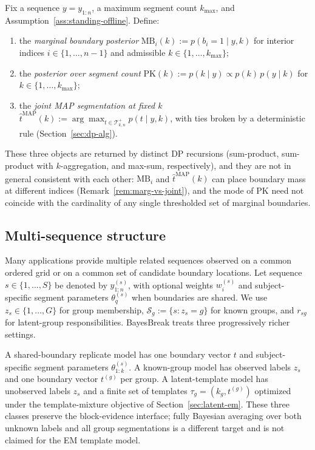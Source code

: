 \begin{definition}
\label{def:posterior-summaries}
Fix a sequence $y=y_{1:n}$, a maximum segment count $k_{\max}$, and Assumption~\ref{ass:standing-offline}.
Define:
\begin{enumerate}[label=(\alph*), leftmargin=2.3em]
    \item the \emph{marginal boundary posterior}
    \(\mathrm{MB}_i(k):=p(b_i=1\mid y,k)\)
    for interior indices $i\in\{1,\dots,n-1\}$ and admissible $k\in\{1,\dots,k_{\max}\}$;
    \item the \emph{posterior over segment count}
    \(\mathrm{PK}(k):=p(k\mid y)\propto p(k)\,p(y\mid k)\)
    for $k\in\{1,\dots,k_{\max}\}$;
    \item the \emph{joint MAP segmentation at fixed $k$}
    \(\widehat t^{\mathrm{MAP}}(k):=\arg\max_{t\in\mathcal{T}^{+}_{k,n}} p(t\mid y,k)\),
    with ties broken by a deterministic rule (Section~\ref{sec:dp-alg}).
\end{enumerate}
These three objects are returned by distinct DP recursions (sum-product, sum-product with
$k$-aggregation, and max-sum, respectively), and they are not in general consistent with each
other: $\mathrm{MB}_i$ and $\widehat t^{\mathrm{MAP}}(k)$ can place boundary mass at different
indices (Remark~\ref{rem:marg-vs-joint}), and the mode of $\mathrm{PK}$ need not coincide with
the cardinality of any single thresholded set of marginal boundaries.
\end{definition}

\subsection{Multi-sequence structure}
\label{sec:problem-multiseq}

Many applications provide multiple related sequences observed on a common ordered grid or on a
common set of candidate boundary locations. Let sequence $s\in\{1,\dots,S\}$ be denoted by
$y^{(s)}_{1:n}$, with optional weights $w_i^{(s)}$ and subject-specific segment parameters
$\theta_q^{(s)}$ when boundaries are shared. We use $z_s\in\{1,\dots,G\}$ for group membership,
$\mathcal{S}_g:=\{s:z_s=g\}$ for known groups, and $r_{sg}$ for latent-group responsibilities.
BayesBreak treats three progressively richer settings.

\begin{definition}
\label{def:multiseq-classes}
A shared-boundary replicate model has one boundary vector $t$ and subject-specific segment
parameters $\theta^{(s)}_{1:k}$. A known-group model has observed labels $z_s$ and one boundary
vector $t^{(g)}$ per group. A latent-template model has unobserved labels $z_s$ and a finite set of
templates $\tau_g=(k_g,t^{(g)})$ optimized under the template-mixture objective of
Section~\ref{sec:latent-em}. These three classes preserve the block-evidence interface; fully
Bayesian averaging over both unknown labels and all group segmentations is a different target and
is not claimed for the EM template model.
\end{definition}

